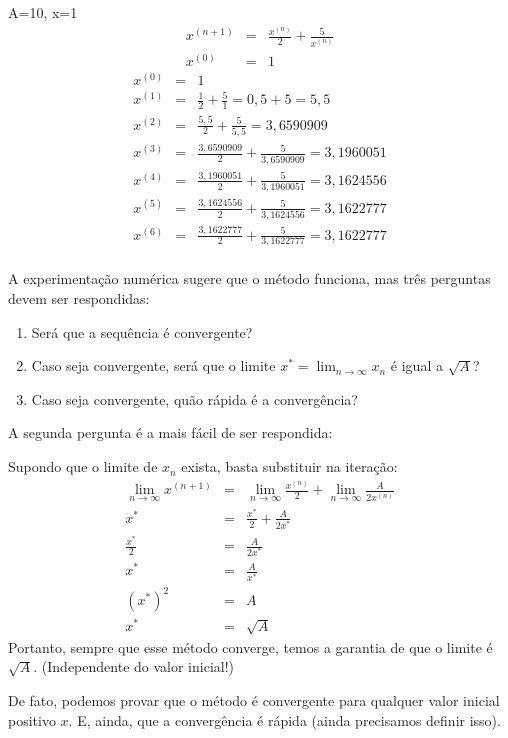\begin{ex}
A=10, x=1
\begin{eqnarray*}
x^{(n+1)}&=&\frac{x^{(n)}}{2}+\frac{5}{x^{(n)}}\\
x^{(0)}&=&1
\end{eqnarray*}
\begin{eqnarray*}
x^{(0)}&=&1\\
x^{(1)}&=&\frac{1}{2}+\frac{5}{1}=0,5+5=5,5\\
x^{(2)}&=&\frac{5,5}{2}+\frac{5}{5,5}=3,6590909 \\
x^{(3)}&=&\frac{3,6590909}{2}+\frac{5}{3,6590909}=3,1960051   \\
x^{(4)}&=&\frac{3,1960051}{2}+\frac{5}{3,1960051}=3,1624556  \\
x^{(5)}&=&\frac{3,1624556}{2}+\frac{5}{3,1624556}=3,1622777  \\
x^{(6)}&=&\frac{3,1622777}{2}+\frac{5}{3,1622777}=3,1622777  \\
\end{eqnarray*}  
\end{ex}

A experimentação numérica sugere que o método funciona, mas três perguntas devem ser respondidas:
\begin{enumerate}
\item Será que a sequência é convergente?
\item Caso seja convergente, será que o limite $x^*=\lim_{n\to \infty }x_n$ é igual a $\sqrt{A}$?
\item Caso seja convergente, quão rápida é a convergência?
\end{enumerate}

A segunda pergunta é a mais fácil de ser respondida:

Supondo que o limite de $x_n$ exista, basta substituir na iteração:
\begin{eqnarray*}
\lim_{n \to \infty }x^{(n+1)}&=&\lim_{n \to \infty }\frac{x^{(n)}}{2}+\lim_{n \to \infty }\frac{A}{2x^{(n)}}\\
x^*&=&\frac{x^*}{2}+\frac{A}{2x^*}\\
\frac{x^*}{2}&=&\frac{A}{2x^*}\\
{x^*}&=&\frac{A}{x^*}\\
{(x^*)}^2&=&{A}\\
x^*&=&\sqrt{A}
\end{eqnarray*}
Portanto, sempre que esse método converge, temos a garantia de que o limite é $\sqrt{A}$. (Independente do valor inicial!)

De fato, podemos provar que o método é convergente para qualquer valor inicial positivo $x$. E, ainda, que a convergência é rápida (ainda precisamos definir isso).

